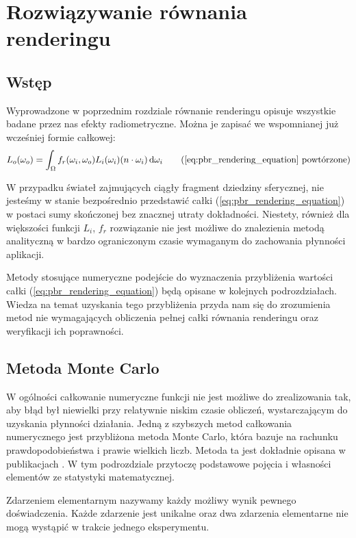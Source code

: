 \documentclass[../main.tex]{subfiles}
\begin{document}
\chapter{Rozwiązywanie równania renderingu}

\section{Wstęp}

Wyprowadzone w poprzednim rozdziale równanie renderingu opisuje wszystkie badane przez nas efekty radiometryczne. Można je zapisać we wspomnianej już wcześniej formie całkowej:
\begin{equation*}
L_{o}(\omega_o) =
\int_{\Omega} {
    f_r(\omega_i, \omega_o)
    L_i(\omega_i)
    (n \cdot \omega_i)
    \dd{\omega_i}
}
\tag{\ref{eq:pbr_rendering_equation} powtórzone}
\end{equation*}

W przypadku świateł zajmujących ciągły fragment dziedziny sferycznej, nie jesteśmy w stanie bezpośrednio przedstawić całki (\ref{eq:pbr_rendering_equation}) w postaci sumy skończonej bez znacznej utraty dokładności. Niestety, również dla większości funkcji $L_i$, $f_r$ rozwiązanie nie jest możliwe do znalezienia metodą analityczną w bardzo ograniczonym czasie wymaganym do zachowania płynności aplikacji.

Metody stosujące numeryczne podejście do wyznaczenia przybliżenia wartości całki (\ref{eq:pbr_rendering_equation}) będą opisane w kolejnych podrozdziałach. Wiedza na temat uzyskania tego przybliżenia przyda nam się do zrozumienia metod nie wymagających obliczenia pełnej całki równania renderingu oraz weryfikacji ich poprawności.

\section{Metoda Monte Carlo}

W ogólności całkowanie numeryczne funkcji nie jest możliwe do zrealizowania tak, aby błąd był niewielki przy relatywnie niskim czasie obliczeń, wystarczającym do uzyskania płynności działania. Jedną z szybszych metod całkowania numerycznego jest przybliżona metoda Monte Carlo, która bazuje na rachunku prawdopodobieństwa i prawie wielkich liczb. Metoda ta jest dokładnie opisana w publikacjach \cite{Sierocinski,MonteCarloAnderson,Veach}. W tym podrozdziale przytoczę podstawowe pojęcia i własności elementów ze statystyki matematycznej.

Zdarzeniem elementarnym nazywamy każdy możliwy wynik pewnego doświadczenia. Każde zdarzenie jest unikalne oraz dwa zdarzenia elementarne nie mogą wystąpić w trakcie jednego eksperymentu.
\end{document}
